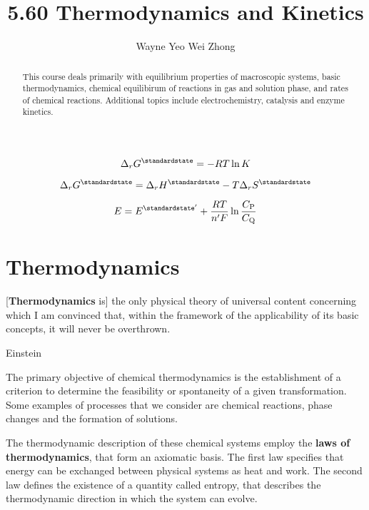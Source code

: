 \documentclass{article}
\title{5.60 Thermodynamics and Kinetics}
\author{Wayne Yeo Wei Zhong}
\numberwithin{theorem}{section}
\numberwithin{corollary}{section}
\numberwithin{postulate}{section}
\numberwithin{lemma}{section}
\numberwithin{definition}{section}
\begin{document}
\maketitle

\begin{abstract}
  This course deals primarily with equilibrium properties of macroscopic
  systems, basic thermodynamics, chemical equilibirum of reactions in gas and
  solution phase, and rates of chemical reactions. Additional topics include
  electrochemistry, catalysis and enzyme kinetics.
\end{abstract}

\tableofcontents

\newpage

\section*{}
\bigskip

\begin{equation*}
  \Delta_r G^{\standardstate} = -RT\ln{K}
\end{equation*}

\begin{equation*}
\Delta_r G^{\standardstate} = \Delta_r H^{\standardstate} - T \Delta_r S^{\standardstate}
\end{equation*}

\begin{equation*}
  E = E^{\standardstate'} + \frac{RT}{n'F} \ln{\frac{C_\mathrm{P}}{C_\mathrm{Q}}}
\end{equation*}
\newpage

\part{Thermodynamics}

\epigraph{[\textbf{Thermodynamics} is] the only physical theory of universal
content concerning which I am convinced that, within the framework of the
applicability of its basic concepts, it will never be overthrown.}{Einstein}

The primary objective of chemical thermodynamics is the establishment of a
criterion to determine the feasibility or spontaneity of a given
transformation. Some examples of processes that we consider are chemical
reactions, phase changes and the formation of solutions. 

The thermodynamic description of these chemical systems employ the \textbf{laws
of thermodynamics}, that form an axiomatic basis. The first law specifies that
energy can be exchanged between physical systems as heat and work.
The second law defines the existence of a quantity called entropy, that
describes the thermodynamic direction in which the system can evolve.
\end{document}
